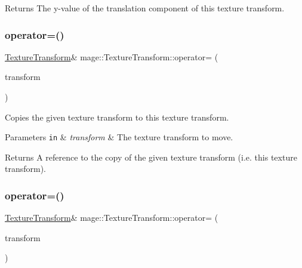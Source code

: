 \begin{DoxyReturn}{Returns}
The y-\/value of the translation component of this texture transform. 
\end{DoxyReturn}
\mbox{\label{classmage_1_1_texture_transform_a0166da366dcf3054db133dda5867cf87}} 
\subsubsection{\texorpdfstring{operator=()}{operator=()}\hspace{0.1cm}{\footnotesize\ttfamily [1/2]}}
{\footnotesize\ttfamily \mbox{\hyperlink{classmage_1_1_texture_transform}{Texture\+Transform}}\& mage\+::\+Texture\+Transform\+::operator= (\begin{DoxyParamCaption}\item[{const \mbox{\hyperlink{classmage_1_1_texture_transform}{Texture\+Transform}} \&}]{transform }\end{DoxyParamCaption})\hspace{0.3cm}{\ttfamily [default]}}

Copies the given texture transform to this texture transform.


\begin{DoxyParams}[1]{Parameters}
\mbox{\tt in}  & {\em transform} & The texture transform to move. \\
\hline
\end{DoxyParams}
\begin{DoxyReturn}{Returns}
A reference to the copy of the given texture transform (i.\+e. this texture transform). 
\end{DoxyReturn}
\mbox{\label{classmage_1_1_texture_transform_a82adfc646b3467f33d92f7f2e24bf28e}} 
\subsubsection{\texorpdfstring{operator=()}{operator=()}\hspace{0.1cm}{\footnotesize\ttfamily [2/2]}}
{\footnotesize\ttfamily \mbox{\hyperlink{classmage_1_1_texture_transform}{Texture\+Transform}}\& mage\+::\+Texture\+Transform\+::operator= (\begin{DoxyParamCaption}\item[{\mbox{\hyperlink{classmage_1_1_texture_transform}{Texture\+Transform}} \&\&}]{transform }\end{DoxyParamCaption})\hspace{0.3cm}{\ttfamily [default]}}


